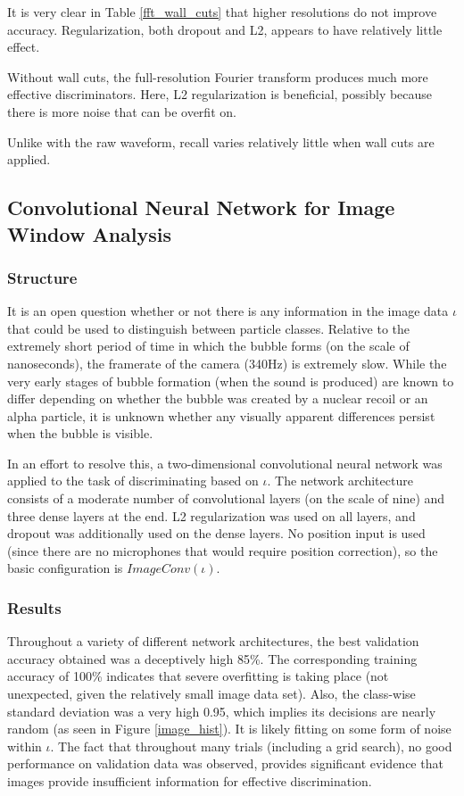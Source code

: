 \documentclass[10pt]{article}
\begin{document}
It is very clear in Table \ref{fft_wall_cuts} that higher resolutions do not improve accuracy. Regularization, both dropout and L2, appears to have relatively little effect.

Without wall cuts, the full-resolution Fourier transform produces much more effective discriminators. Here, L2 regularization is beneficial, possibly because there is more noise that can be overfit on.

Unlike with the raw waveform, recall varies relatively little when wall cuts are applied.

\subsection{Convolutional Neural Network for Image Window Analysis}

\subsubsection{Structure}

It is an open question whether or not there is any information in the image data $\iota$ that could be used to distinguish between particle classes. Relative to the extremely short period of time in which the bubble forms (on the scale of nanoseconds), the framerate of the camera (340Hz) is extremely slow. While the very early stages of bubble formation (when the sound is produced) are known to differ depending on whether the bubble was created by a nuclear recoil or an alpha particle, it is unknown whether any visually apparent differences persist when the bubble is visible.

In an effort to resolve this, a two-dimensional convolutional neural network was applied to the task of discriminating based on $\iota$. The network architecture consists of a moderate number of convolutional layers (on the scale of nine) and three dense layers at the end. L2 regularization was used on all layers, and dropout was additionally used on the dense layers. No position input is used (since there are no microphones that would require position correction), so the basic configuration is $ImageConv(\iota)$.

\subsubsection{Results}

Throughout a variety of different network architectures, the best validation accuracy obtained was a deceptively high 85\%. The corresponding training accuracy of 100\% indicates that severe overfitting is taking place (not unexpected, given the relatively small image data set). Also, the class-wise standard deviation was a very high 0.95, which implies its decisions are nearly random (as seen in Figure \ref{image_hist}). It is likely fitting on some form of noise within $\iota$. The fact that throughout many trials (including a grid search), no good performance on validation data was observed, provides significant evidence that images provide insufficient information for effective discrimination.
\end{document}
